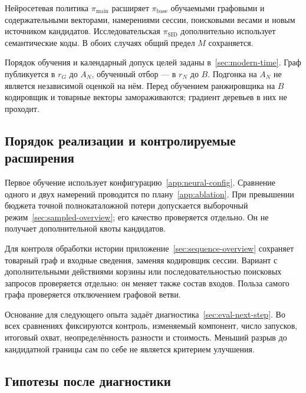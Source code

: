 \documentclass[12pt,a4paper]{article}
\theoremstyle{plainru}
\begin{document}
Нейросетевая политика $\pi_{\mathrm{main}}$ расширяет
$\pi_{\mathrm{base}}$ обучаемыми графовыми и содержательными векторами,
намерениями сессии, поисковыми весами и новым источником кандидатов.
Исследовательская $\pi_{\mathrm{SID}}$ дополнительно использует
семантические коды. В обоих случаях общий предел $M$ сохраняется.

Порядок обучения и календарный допуск целей заданы в~\ref{sec:modern-time}.
Граф публикуется в $r_G$ до $A_N$, обученный отбор --- в $r_N$ до $B$.
Подгонка на $A_N$ не является независимой оценкой на нём.
Перед обучением ранжировщика на $B$ кодировщик и товарные векторы
замораживаются; градиент деревьев в них не проходит.

\subsection{Порядок реализации и контролируемые расширения}
\label{sec:research-stages}

Первое обучение использует конфигурацию~\ref{app:neural-config}.
Сравнение одного и двух намерений проводится по плану~\ref{app:ablation}.
При превышении бюджета точной полнокаталожной потери допускается
выборочный режим~\ref{sec:sampled-overview}; его качество проверяется
отдельно. Он не получает дополнительной квоты кандидатов.

Для контроля обработки истории приложение~\ref{sec:sequence-overview}
сохраняет товарный граф и входные сведения, заменяя кодировщик сессии.
Вариант с дополнительными действиями корзины или последовательностью
поисковых запросов проверяется отдельно: он меняет также состав входов.
Польза самого графа проверяется отключением графовой ветви.

Основание для следующего опыта задаёт диагностика~\ref{sec:eval-next-step}.
Во всех сравнениях фиксируются контроль, изменяемый компонент,
число запусков, итоговый охват, неопределённость разности и стоимость.
Меньший разрыв до кандидатной границы сам по себе не является
критерием улучшения.

\subsection{Гипотезы после диагностики}\label{sec:research-hypotheses}
\end{document}
